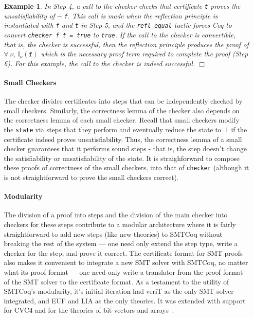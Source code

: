 \documentclass{article}
\newtheorem{example}{Example}[section]
\newcommand{\intr}[1]{\mathbb{I}_{\nu}(#1)}
\begin{document}
\begin{example}
		In Step 4, a call to the checker 
		checks that certificate \texttt{t} 
		proves the unsatisfiability of $\neg$
		\texttt{f}. This call is made
		when the reflection principle 
		is instantiated with \texttt{f} and 
		\texttt{t} in Step 5, and the 
		\texttt{refl\_equal} tactic forces 
		Coq to convert 
		\texttt{checker f t = true} to 
		\texttt{true}. If the call to the 
		checker is convertible, that is,
		the checker is successful, then 
		the reflection principle produces 
		the proof of 
		$\forall\ \nu,\ \intr{\texttt{f}}$
		which is the necessary proof term 
		required to complete the proof 
		(Step 6). For 
		this example, the call to the 
		checker is indeed successful.
		\hfill $\Box$
	\end{example}

	\paragraph{Small Checkers}
	The checker divides certificates
	into steps that can be independently 
	checked by small checkers.
	Similarly, the correctness lemma
	of the checker also depends on 
	the correctness lemma of each 
	small checker. Recall that 
	small checkers modify the 
	\texttt{state} via steps that 
	they perform and eventually
	reduce the state to $\bot$ if 
	the certificate indeed proves
	unsatisfiability.  Thus, the 
	correctness lemma of a small 
	checker guarantees that it
	performs sound steps - that is,
	the step doesn't change the 
	satisfiability or unsatisfiability
	of the state. It is straighforward
	to compose these proofs 
	of correctness of the small 
	checkers, into that of
	\texttt{checker} (although
	it is not straightforward 
	to prove the small checkers 
	correct). 
	
	\paragraph{Modularity} The division 
	of a proof into steps and 
	the division of the main 
	checker into checkers for these
	steps contribute to a 
	modular architecture where it 
	is fairly straightforward to 
	add new steps (like new theories)
	to SMTCoq without breaking 
	the rest of the system --- one 
	need only extend the step type,
	write a checker for the step, 
	and prove it correct. The 
	certificate format for SMT
	proofs also makes it 
	convenient to integrate a 
	new SMT solver with SMTCoq, 
	no matter what its proof format
	--- one need only write a translator
	from the proof format of the SMT
	solver to the certificate format. 
	As a testament to the utility of
	SMTCoq's modularity, it's 
	initial iteration had veriT as 
	the only SMT solver integrated, 
	and EUF and LIA as the only 
	theories. It was extended 
	with support for CVC4 and 
	for the theories of 
	bit-vectors and 
	arrays~\cite{DBLP:journals/corr/EkiciKKMRT16}.
	
\end{document}
